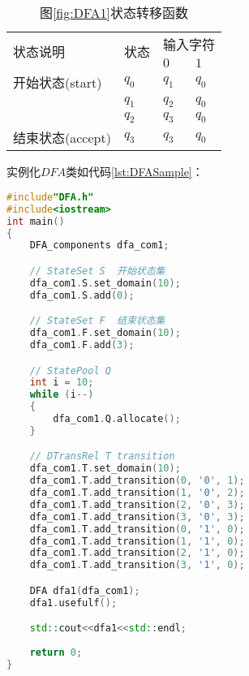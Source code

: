\begin{table}[!htbp]
    \caption{图{\ref{fig:DFA1}}状态转移函数}
    \label{tab:DFA1}
    \centering
    \small%
    \setlength{\tabcolsep}{4pt}%
    \renewcommand{\arraystretch}{1.2}%
    \begin{tabular}{l p{3em}<{\centering} p{3em}<{\centering} p{3em}<{\centering}}
        \toprule %
        \multirow{2}{*}{状态说明} & \multirow{2}{*}{状态} & \multicolumn{2}{c}{输入字符} \\
		\cline{3-4}      &    &$0$ & $1$  \\
        \midrule%
        开始状态(start)          & $q_0$ & $q_1$  & $q_0$    \\
                                & $q_1$ & $q_2$  & $q_0$    \\
                                & $q_2$ & $q_3$  & $q_0$    \\
        结束状态(accept)         & $q_3$ & $q_3$  & $q_0$    \\
        \bottomrule%
    \end{tabular}
\end{table}

实例化$DFA$类如代码\ref{lst:DFASample}：

\lstset{style=mystyle}
\begin{lstlisting}[language=C++,label={lst:DFASample},caption={实例化DFA示例}]
#include"DFA.h"
#include<iostream>
int main()
{
    DFA_components dfa_com1;

    // StateSet S  开始状态集
    dfa_com1.S.set_domain(10);
    dfa_com1.S.add(0);

    // StateSet F  结束状态集
    dfa_com1.F.set_domain(10);
    dfa_com1.F.add(3);

    // StatePool Q 
    int i = 10;
    while (i--)
    {
        dfa_com1.Q.allocate();
    }

    // DTransRel T transition             
    dfa_com1.T.set_domain(10);
    dfa_com1.T.add_transition(0, '0', 1);
    dfa_com1.T.add_transition(1, '0', 2);
    dfa_com1.T.add_transition(2, '0', 3);
    dfa_com1.T.add_transition(3, '0', 3);
    dfa_com1.T.add_transition(0, '1', 0);
    dfa_com1.T.add_transition(1, '1', 0);
    dfa_com1.T.add_transition(2, '1', 0);
    dfa_com1.T.add_transition(3, '1', 0);

    DFA dfa1(dfa_com1);
    dfa1.usefulf();

    std::cout<<dfa1<<std::endl;
	
    return 0;
}
\end{lstlisting}

